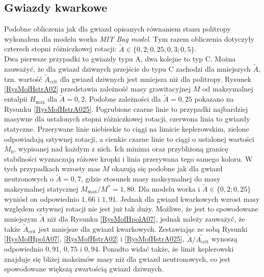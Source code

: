 \documentclass{bachelor_thesis}
\begin{document}
        \subsection{Gwiazdy kwarkowe}
            Podobne obliczenia jak dla gwiazd opisanych równaniem stanu politropy wykonałem dla modelu worka \textit{MIT Bag model}. Tym razem obliczenia dotyczyły czterech stopni różniczkowej rotacji: $\tilde{A}\in\{0,2; 0,25; 0,3; 0,5\}$.\\
            \indent Dwa pierwsze przypadki to gwiazdy typu A, dwa kolejne to typ C. Można zauważyć, że dla gwiazd dziwnych przejście do typu C zachodzi dla mniejszych $\tilde{A}$, tzn. wartość $\tilde{A}_{\textrm{crit}}$ dla gwiazd dziwnych jest mniejsza niż dla politropy. Rysunek \ref{RysMofHstrA02} przedstawia zależność masy grawitacyjnej $M$ od maksymalnej entalpii $H_{\textrm{max}}$ dla $\tilde{A}=0,2$. Podobne zależności dla $\tilde{A}=0,25$ pokazano na Rysunku \ref{RysMofHstrA025}. Pogrubione czarne linie to przypadki najbardziej masywne dla ustalonych stopni różniczkowej rotacji, czerwona linia to gwiazdy statyczne. Przerywane linie niebieskie to ciągi na limicie keplerowskim, zielone odpowiadają sztywnej rotacji, a cienkie czarne linie to ciągi o ustalonej wartości $M_0$, wypisanej nad każdym z nich. Ich minima oraz przybliżoną granicę stabilności wyznaczają różowe kropki i linia przerywana tego samego koloru. W tych przypadkach wzrosty mas $M$ okazują się podobne jak dla gwiazd neutronowych o $\tilde{A}=0,7$, gdzie stosunek masy maksymalnej do masy maksymalnej statycznej $M_\textrm{max}/M^*=1,80$. Dla modelu worka i $\tilde{A}\in\{0,2;0,25\}$ wyniósł on odpowiednio $1,66$ i $1,91$. Jednak dla gwiazd kwarkowych wzrost masy względem sztywnej rotacji nie jest już tak duży. Możliwe, że jest to spowodowane mniejszym $\tilde{A}$ niż dla Rysunku \ref{RysMofHpolA07}, jednak należy zauważyć, że także $\tilde{A}_\textrm{crit}$ jest mniejsze dla gwiazd kwarkowych. Zestawiając ze sobą Rysunki \ref{RysMofHpolA07}, \ref{RysMofHstrA02} i \ref{RysMofHstrA025}, $\tilde{A}/\tilde{A_\textrm{crit}}$ wynoszą odpowiednio $0,91$, $0,75$ i $0,94$. Ponadto widać także, że limit keplerowski znajduje się bliżej maksimów masy niż dla gwiazd neutronowych, co jest spowodowane większą zwartością gwiazd dziwnych.
\end{document}
